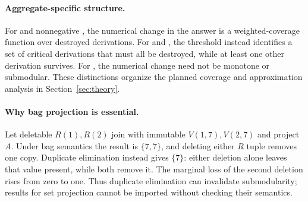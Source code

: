 \paragraph{Aggregate-specific structure.}
For  and nonnegative , the numerical change in
the answer is a weighted-coverage function over destroyed derivations.
For  and , the threshold instead identifies a set
of critical derivations that must all be destroyed, while at least one
other derivation survives. For , the numerical change need
not be monotone or submodular. These distinctions organize the planned
coverage and approximation analysis in Section~\ref{sec:theory}.

\paragraph{Why bag projection is essential.}
Let deletable $R(1),R(2)$ join with immutable $V(1,7),V(2,7)$ and project
$A$. Under bag semantics the result is $\{7,7\}$, and deleting either
$R$ tuple removes one copy. Duplicate elimination instead gives $\{7\}$: either deletion alone
leaves that value present, while both remove it.
The marginal  loss of the second deletion rises from zero to
one. Thus duplicate elimination can invalidate submodularity; results for
set projection cannot be imported without checking their semantics.

